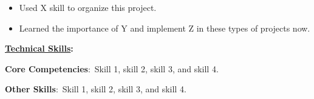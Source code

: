 \documentclass[11pt]{article}
\begin{document}
    \begin{itemize}[noitemsep,nolistsep]
        \item Used X skill to organize this project.
        \item Learned the importance of Y and implement Z in these types of projects now.
    \end{itemize}
    \vspace{1mm}

\vspace{2mm}
    \noindent\begin{Large}\textbf{\underline{Technical Skills}: } \end{Large}
    \vspace{1mm}

    \textbf{Core Competencies}: \,Skill 1, skill 2, skill 3, and skill 4.

    \textbf{Other Skills}: \,Skill 1, skill 2, skill 3, and skill 4.

    \vspace{2mm}
    
\end{document}
